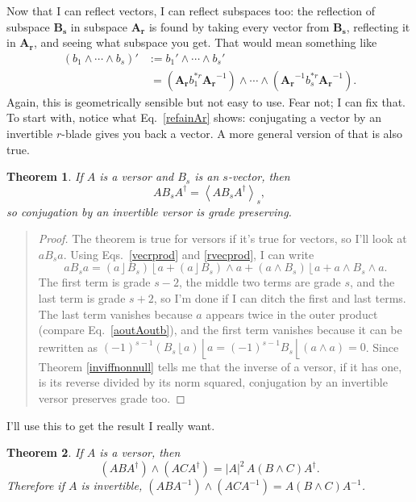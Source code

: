 \documentclass{utarticle}
\newcommand{\bl}[1]{\ensuremath{\bm{#1}}}
\DeclareMathOperator{\lin}{\rfloor}
\DeclareMathOperator{\rin}{\lfloor}
\DeclareMathOperator{\out}{\wedge}
\newcommand{\grinv}[2][]{\ensuremath{#2^{*#1}}}
\newcommand{\rev}[1]{\ensuremath{#1^\dagger}}
\newcommand{\grade}[2][]{\ensuremath{\left\langle #2 \right\rangle_{#1}}}
\newtheorem{thm}{Theorem}
\newcommand{\bp}{\begin{quotation} \begin{proof}}
\newcommand{\ep}{\end{proof} \end{quotation}}
\begin{document}
Now that I can reflect vectors, I can reflect subspaces too: the reflection of subspace \bl{B_s}
in subspace \bl{A_r} is found by taking every vector from \bl{B_s}, reflecting it in \bl{A_r}, and 
seeing what subspace you get.  That would mean something like
\begin{align} 
(b_1 \out \dotsb \out b_s)' & := b_1' \out \dotsb \out b_s' \nonumber \\
                                              & \ = \left(\bl{A_r} \grinv[r]{b_1} \bl{A_r}^{-1}\right) \out 
                                    \dotsb \out \left(\bl{A_r}^{-1} \grinv[r]{b_s} \bl{A_r}^{-1}\right).
\end{align}
Again, this is geometrically sensible but not easy to use.  Fear not; I can fix that.  To start with,
notice what Eq.~\eqref{refainAr} shows: conjugating a vector by an invertible $r$-blade gives 
you back a vector.  A more general version of that is also true.
\begin{thm}
If $A$ is a versor and $B_s$ is an $s$-vector, then
\begin{equation} A B_s \rev{A} = \grade[s]{A B_s \rev{A}}, \end{equation}
so conjugation by an invertible versor is grade preserving.
\end{thm}
\bp
The theorem is true for versors if it's true for vectors, so I'll look at $a B_s a$.  Using 
Eqs.~\eqref{vecrprod} and \eqref{rvecprod}, I can write
\begin{equation} 
a B_s a = (a \lin B_s) \rin a + (a \lin B_s) \out a + (a \out B_s) \rin a + a \out B_s \out a.
\end{equation}
The first term is grade $s-2$, the middle two terms are grade $s$, and the last term is grade $s+2$,
so I'm done if I can ditch the first and last terms.  The last term vanishes because $a$ appears
twice in the outer product (compare Eq.~\eqref{aoutAoutb}), and the first term vanishes because 
it can be rewritten as $(-1)^{s-1} (B_s \rin a) \rin a = (-1)^{s-1} B_s \rin (a \out a) = 0$.  Since 
Theorem \ref{inviffnonnull} tells me that the inverse of a versor, if it has one, is its reverse divided by 
its norm squared, conjugation by an invertible versor preserves grade too.
\ep
I'll use this to get the result I really want.
\begin{thm}
If $A$ is a versor, then 
\begin{equation} 
(A B \rev{A}) \out (A C \rev{A}) = |A|^2 \, A (B \out C) \rev{A}.  
\end{equation}
Therefore if $A$ is invertible, $(A B A^{-1}) \out (A C A^{-1}) = A (B \out C) A^{-1}$.
\end{thm}
\end{document}
